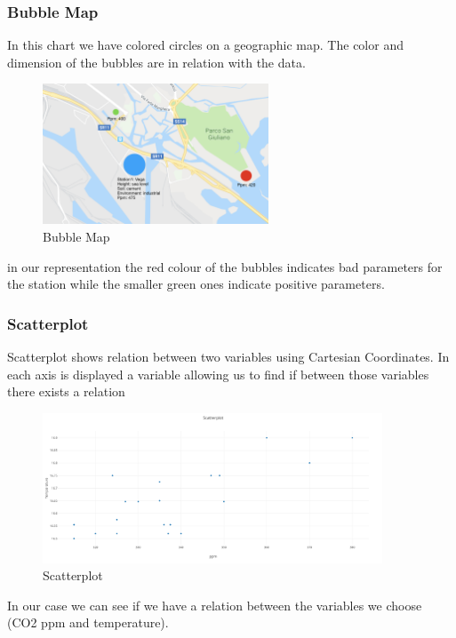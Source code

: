 \documentclass[12pt]{article} %
\begin{document}
\subsubsection{Bubble Map}
In this chart we have colored circles on a geographic map. The color and dimension of the bubbles are in relation with the data.
\begin{figure}[H]
  \centering
  \includegraphics[width=0.6\textwidth]{img/bubbleMap.png}
  \caption{Bubble Map}
  \label{fig:bublMap}
\end{figure}
in our representation the red colour of the bubbles indicates bad parameters for the station while the smaller green ones indicate positive parameters.

\subsubsection{Scatterplot}
Scatterplot shows relation between two variables using Cartesian Coordinates.
In each axis is displayed a variable allowing us to find if between those variables there exists a relation
\begin{figure}[H]
  \centering
  \includegraphics[width=0.9\textwidth]{img/scatterplot.png}
  \caption{Scatterplot}
  \label{fig:scttrPlot}
\end{figure}
In our case we can see if we have a relation between the variables we choose (CO2 ppm and temperature).

\newpage
\end{document}

